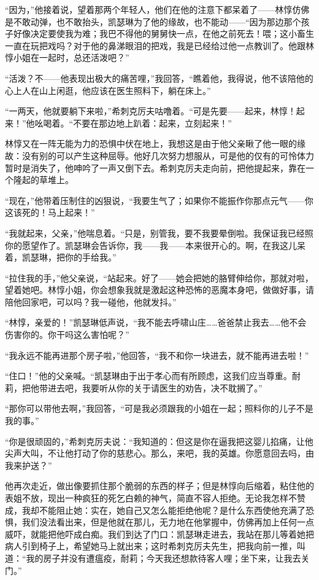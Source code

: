 \par “因为，”他接着说，望着那两个年轻人，他们在他的注意下都呆着了——林惇仿佛是不敢动弹，也不敢抬头，凯瑟琳为了他的缘故，也不能动——“因为那边那个孩子好像决定要使我为难；我巴不得他的舅舅快一点，在他之前死去！喂；这小畜生一直在玩把戏吗？对于他的鼻涕眼泪的把戏，我是已经给过他一点教训了。他跟林惇小姐在一起时，总还活泼吧？”
\par “活泼？不——他表现出极大的痛苦哩，”我回答，“瞧着他，我得说，他不该陪他的心上人在山上闲逛，他应该在医生照料下，躺在床上。”
\par “一两天，他就要躺下来啦，”希刺克厉夫咕噜着。“可是先要——起来，林惇！起来！”他吆喝着。“不要在那边地上趴着：起来，立刻起来！”
\par 林惇又在一阵无能为力的恐惧中伏在地上，我想这是由于他父亲瞅了他一眼的缘故：没有别的可以产生这种屈辱。他好几次努力想服从，可是他的仅有的可怜体力暂时是消失了，他呻吟了一声又倒下去。希刺克厉夫走向前，把他提起来，靠在一个隆起的草堆上。
\par “现在，”他带着压制住的凶狠说，“我要生气了；如果你不能振作你那点元气——你这该死的！马上起来！”
\par “我就起来，父亲，”他喘息着。“只是，别管我，要不我要晕倒啦。我保证我已经照你的愿望作了。凯瑟琳会告诉你，我——我——本来很开心的。啊，在我这儿呆着，凯瑟琳，把你的手给我。”
\par “拉住我的手，”他父亲说，“站起来。好了——她会把她的胳臂伸给你，那就对啦，望着她吧。林惇小姐，你会想象我就是激起这种恐怖的恶魔本身吧，做做好事，请陪他回家吧，可以吗？我一碰他，他就发抖。”
\par “林惇，亲爱的！”凯瑟琳低声说，“我不能去呼啸山庄……爸爸禁止我去……他不会伤害你的。你干吗这么害怕呢？”
\par “我永远不能再进那个房子啦，”他回答，“我不和你一块进去，就不能再进去啦！”
\par “住口！”他的父亲喊。“凯瑟琳由于出于孝心而有所顾虑，这我们应当尊重。耐莉，把他带进去吧，我要听从你的关于请医生的劝告，决不耽搁了。”
\par “那你可以带他去啊，”我回答，“可是我必须跟我的小姐在一起；照料你的儿子不是我的事。”
\par “你是很顽固的，”希刺克厉夫说：“我知道的：但这是你在逼我把这婴儿掐痛，让他尖声大叫，不让他打动了你的慈悲心。那么，来吧，我的英雄。你愿意回去吗，由我来护送？”
\par 他再次走近，做出像要抓住那个脆弱的东西的样子；但是林惇向后缩着，粘住他的表姐不放，现出一种疯狂的死乞白赖的神气，简直不容人拒绝。无论我怎样不赞成，我却不能阻止她：实在，她自己又怎么能拒绝他呢？是什么东西使他充满了恐惧，我们没法看出来，但是他就在那儿，无力地在他掌握中，仿佛再加上任何一点威吓，就能把他吓成白痴。我们到达了门口：凯瑟琳走进去，我站在那儿等着她把病人引到椅子上，希望她马上就出来；这时希刺克厉夫先生，把我向前一推，叫道：“我的房子并没有遭瘟疫，耐莉；今天我还想款待客人哩；坐下来，让我去关门。”
